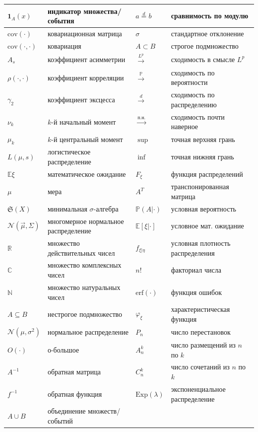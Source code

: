 \begin{longtable}{|p{3cm}|p{4cm}|p{3cm}|p{4cm}|}
\hline
$\mathbf{1}_A(x)$ & индикатор множества/события & $a \stackrel{d}{=} b$ & сравнимость по модулю \\
\hline
$\mathrm{cov}(\cdot)$ & ковариационная матрица & $\sigma$ & стандартное отклонение \\
\hline
$\mathrm{cov}(\cdot, \cdot)$ & ковариация & $A \subset B$ & строгое подмножество \\
\hline
$A_s$ & коэффициент асимметрии & $\xrightarrow{L^p}$ & сходимость в смысле $L^p$ \\
\hline
$\rho(\cdot, \cdot)$ & коэффициент корреляции & $\xrightarrow{\mathbb{P}}$ & сходимость по вероятности \\
\hline
$\gamma_2$ & коэффициент эксцесса & $\xrightarrow{d}$ & сходимость по распределению \\
\hline
$\nu_k$ & $k$-й начальный момент & $\xrightarrow{\text{п.н.}}$ & сходимость почти наверное \\
\hline
$\mu_k$ & $k$-й центральный момент & $\sup$ & точная верхняя грань \\
\hline
$L(\mu, s)$ & логистическое распределение & $\inf$ & точная нижняя грань \\
\hline
$\mathbb{E}\xi$ & математическое ожидание & $F_{\xi}$ & функция распределений \\
\hline
$\mu$ & мера & $A^T$ & транспонированная матрица \\
\hline
$\mathfrak{S}(X)$ & минимальная $\sigma$-алгебра & $\mathbb{P}(A | \cdot)$ & условная вероятность \\
\hline
$\mathcal{N}(\vec{\mu}, \Sigma)$ & многомерное нормальное распределение & $\mathbb{E}[\xi | \cdot]$ & условное мат. ожидание \\
\hline
$\mathbb{R}$ & множество действительных чисел & $f_{\xi|\eta}$ & условная плотность распределения \\
\hline
$\mathbb{C}$ & множество комплексных чисел & $n!$ & факториал числа \\
\hline
$\mathbb{N}$ & множество натуральных чисел & $\mathrm{erf}(\cdot)$ & функция ошибок \\
\hline
$A \subseteq B$ & нестрогое подмножество & $\varphi_{\xi}$ & характеристическая функция \\
\hline
$\mathcal{N}(\mu, \sigma^2)$ & нормальное распределение & $P_n$ & число перестановок \\
\hline
$O(\cdot)$ & о-большое & $A_n^k$ & число размещений из $n$ по $k$ \\
\hline
$A^{-1}$ & обратная матрица & $C_n^k$ & число сочетаний из $n$ по $k$ \\
\hline
$f^{-1}$ & обратная функция & $\mathrm{Exp}(\lambda)$ & экспоненциальное распределение \\
\hline
$A \cup B$ & объединение множеств/событий & & \\
\hline

\end{longtable}